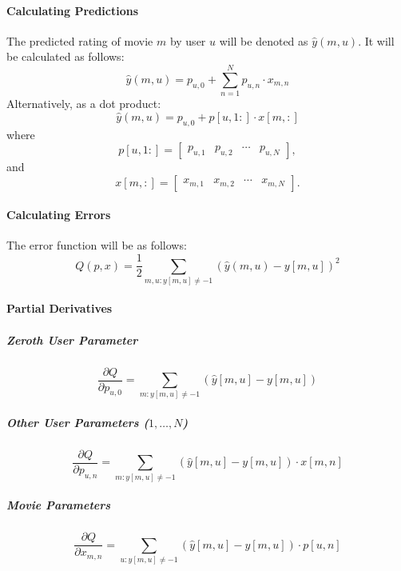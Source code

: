 \documentclass[a4paper,9pt]{article}
\begin{document}
\paragraph{Calculating Predictions}
The predicted rating of movie \( m \) by user \( u \) will be denoted as \( \hat{y}(m,u) \). It will be calculated as follows:
\begin{equation}
	\hat{y}(m,u) = p_{u,0} + \sum_{n=1}^N p_{u,n} \cdot x_{m,n} \tag{7}
\end{equation}
Alternatively, as a dot product:
\begin{equation}
	\hat{y}(m,u) = p_{u,0} + p[u,1:] \cdot x[m,:] \tag{8}
\end{equation}
where
\begin{equation}
	p[u,1:] = \begin{bmatrix}
		p_{u,1} & p_{u,2} & \cdots & p_{u,N}
	\end{bmatrix}, \tag{9}
\end{equation}
and
\begin{equation}
	x[m,:] = \begin{bmatrix}
		x_{m,1} & x_{m,2} & \cdots & x_{m,N}
	\end{bmatrix}. \tag{10}
\end{equation}

\paragraph{Calculating Errors}
The error function will be as follows:
\begin{equation}
	Q(p,x) = \frac{1}{2} \sum_{m,u : y[m,u] \neq -1} (\hat{y}(m,u) - y[m,u])^2 \tag{11}
\end{equation}

\paragraph{Partial Derivatives}
\subparagraph{Zeroth User Parameter}
\begin{equation}
	\frac{\partial Q}{\partial p_{u,0}} = \sum_{m : y[m,u] \neq -1} (\hat{y}[m,u] - y[m,u]) \tag{12}
\end{equation}

\subparagraph{Other User Parameters (\(1, \ldots, N\))}
\begin{equation}
	\frac{\partial Q}{\partial p_{u,n}} = \sum_{m : y[m,u] \neq -1} (\hat{y}[m,u] - y[m,u]) \cdot x[m,n] \tag{13}
\end{equation}

\subparagraph{Movie Parameters}
\begin{equation}
	\frac{\partial Q}{\partial x_{m,n}} = \sum_{u : y[m,u] \neq -1} (\hat{y}[m,u] - y[m,u]) \cdot p[u,n] \tag{14}
\end{equation}
\end{document}

